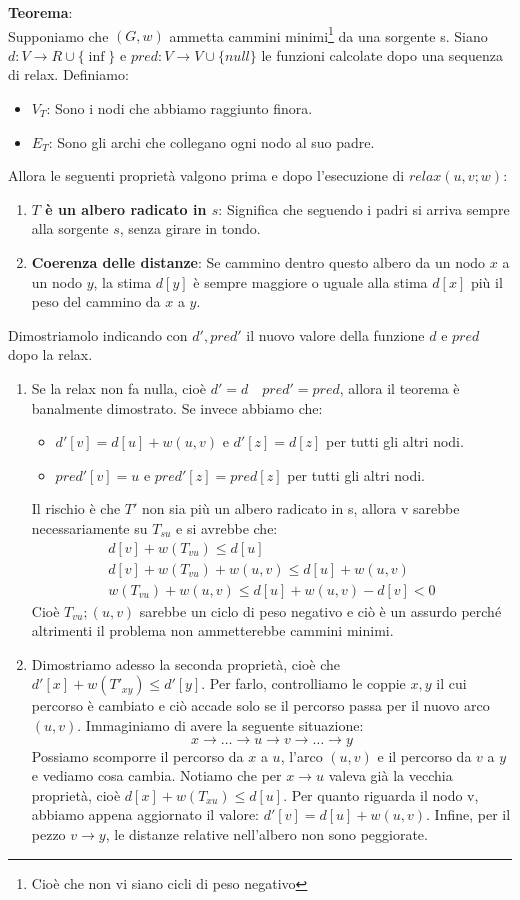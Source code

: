 \textbf{Teorema}:\\
Supponiamo che $(G,w)$ ammetta cammini minimi\footnote{Cioè che non vi siano cicli di peso negativo} da una sorgente s. Siano $d:V \rightarrow R \cup \{\inf\}$ e $pred:V \rightarrow V\cup \{null\}$ le funzioni calcolate dopo una sequenza di relax. Definiamo:
\begin{itemize}
    \item $V_T$: Sono i nodi che abbiamo raggiunto finora.
    \item $E_T$: Sono gli archi che collegano ogni nodo al suo padre.
\end{itemize}
Allora le seguenti proprietà valgono prima e dopo l'esecuzione di $relax(u,v;w)$:
\begin{enumerate}
    \item \textbf{$T$ è un albero radicato in $s$}: Significa che seguendo i padri si arriva sempre alla sorgente $s$, senza girare in tondo.
    \item \textbf{Coerenza delle distanze}: Se cammino dentro questo albero da un nodo $x$ a un nodo $y$, la stima $d[y]$ è sempre maggiore o uguale alla stima $d[x]$ più il peso del cammino da $x$ a $y$.
\end{enumerate}
Dimostriamolo indicando con $d', pred'$ il nuovo valore della funzione $d$ e $pred$ dopo la relax. 
\begin{enumerate}
    \item Se la relax non fa nulla, cioè $d'= d \quad pred' = pred$, allora il teorema è banalmente dimostrato. Se invece abbiamo che:
        \begin{itemize}
            \item $d'[v] = d[u]+w(u,v)$ e $d'[z]=d[z]$ per tutti gli altri nodi.
            \item $pred'[v] = u$ e $pred'[z]=pred[z]$ per tutti gli altri nodi.
        \end{itemize}
    Il rischio è che $T'$ non sia più un albero radicato in s, allora v sarebbe necessariamente su $T_{su}$ e si avrebbe che:
    \begin{align*}
        d[v]+w(T_{vu}) \leq d[u]\\
        d[v] + w(T_{vu}) + w(u,v)\leq d[u]+w(u,v)\\
        w(T_{vu})+w(u,v) \leq d[u] + w(u,v) - d[v] < 0
    \end{align*}
    Cioè $T_{vu};(u,v)$ sarebbe un ciclo di peso negativo e ciò è un assurdo perché altrimenti il problema non ammetterebbe cammini minimi.
    \item Dimostriamo adesso la seconda proprietà, cioè che $d'[x] + w(T'_{xy}) \le d'[y]$. Per farlo, controlliamo le coppie $x,y$ il cui percorso è cambiato e ciò accade solo se il percorso passa per il nuovo arco $(u,v)$.  Immaginiamo di avere la seguente situazione:
    \[x \to \dots \to u \to v \to \dots \to y\]
    Possiamo scomporre il percorso da $x$ a $u$, l'arco $(u,v)$ e il percorso da $v$ a $y$ e vediamo cosa cambia. Notiamo che per $x \to u$ valeva già la vecchia proprietà, cioè $d[x] + w(T_{xu}) \le d[u]$. Per quanto riguarda il nodo v,  abbiamo appena aggiornato il valore: $d'[v] = d[u] + w(u, v)$. Infine, per il pezzo $v \to y$, le distanze relative nell'albero non sono peggiorate.
\end{enumerate}
